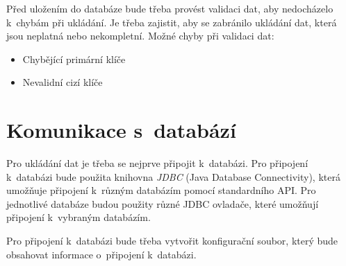 Před uložením do databáze bude třeba provést validaci dat, aby nedocházelo k~chybám při
ukládání. Je třeba zajistit, aby se zabránilo ukládání dat, která jsou neplatná nebo nekompletní.
Možné chyby při validaci dat:
\begin{itemize}
    \item Chybějící primární klíče
    \item Nevalidní cizí klíče
\end{itemize}

\section{Komunikace s~databází}
\label{sec:komunikaceDB}
Pro ukládání dat je třeba se nejprve připojit k~databázi.
Pro připojení k~databázi bude použita knihovna \textit{JDBC} (Java Database Connectivity), která
umožňuje připojení k~různým databázím pomocí standardního API.
Pro jednotlivé databáze budou použity různé JDBC ovladače, které umožňují připojení k~vybraným databázím.

Pro připojení k~databázi bude třeba vytvořit konfigurační soubor, který bude obsahovat
informace o~připojení k~databázi.